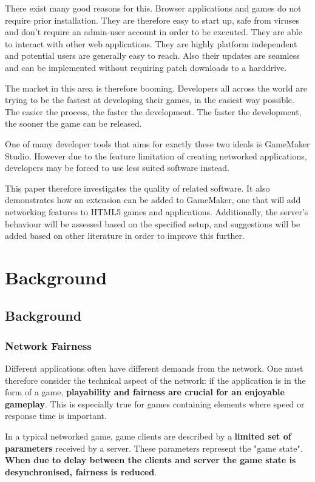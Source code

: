 \documentclass[bsc,frontabs,twoside,singlespacing,parskip,deptreport]{infthesis}     %
\begin{document}
There exist many good reasons for this. Browser applications and games do not require prior installation. They are therefore easy to start up, safe from viruses and don't require an admin-user account in order to be executed\cite{Web_Apps_Superior}. They are able to interact with other web applications. They are highly platform independent and potential users are generally easy to reach. Also their updates are seamless and can be implemented without requiring patch downloads to a harddrive.

The market in this area is therefore booming. Developers all across the world are trying to be the fastest at developing their games, in the easiest way possible. The easier the process, the faster the development. The faster the development, the sooner the game can be released.

One of many developer tools that aims for exactly these two ideals is GameMaker Studio. However due to the feature limitation of creating networked applications, developers may be forced to use less suited software instead. 

This paper therefore investigates the quality of related software. It also demonstrates how an extension can be added to GameMaker, one that will add networking features to HTML5 games and applications. Additionally, the server's behaviour will be assessed based on the specified setup, and suggestions will be added based on other literature in order to improve this further.

\chapter{Background}
\section{Background}

\subsection{Network Fairness}
Different applications often have different demands from the network. One must therefore consider the technical aspect of the network: if the application is in the form of a game, \textbf{playability and fairness are crucial for an enjoyable gameplay}. This is especially true for games containing elements where speed or response time is important\cite{Fairness_and_Playability}.

In a typical networked game, game clients are described by a \textbf{limited set of parameters} received by a server. These parameters represent the "game state". \textbf{When due to delay between the clients and server the game state is desynchronised, fairness is reduced}\cite{Fairness_and_Playability}.
\end{document}

